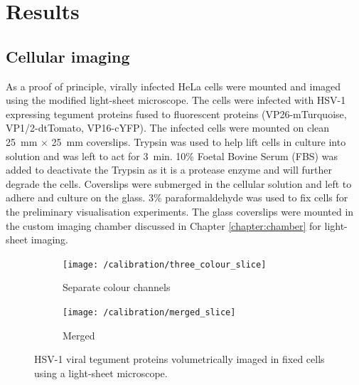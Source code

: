 \section{Results}

\subsection{Cellular imaging}

As a proof of principle, virally infected HeLa cells were mounted and imaged using the modified light-sheet microscope.
The cells were infected with HSV-1 expressing tegument proteins fused to fluorescent proteins (VP26-mTurquoise, VP1/2-dtTomato, VP16-cYFP).
The infected cells were %
mounted on clean \SI{25}{\milli\metre} $\times$ \SI{25}{\milli\metre} coverslips.
Trypsin was used to help lift cells in culture into solution and was left to act for \SI{3}{\minute}.
10\% Foetal Bovine Serum (FBS) was added to deactivate the Trypsin as it is a protease enzyme and will further degrade the cells.
Coverslips were submerged in the cellular solution and left to adhere and culture on the glass.
3\% paraformaldehyde was used to fix cells for the preliminary visualisation experiments.
The glass coverslips were mounted in the custom imaging chamber discussed in Chapter \ref{chapter:chamber} for light-sheet imaging.


\begin{figure}
	\centering
	\begin{subfigure}[b]{0.7\linewidth}
    \centering
    \texttt{[image: /calibration/three\_colour\_slice]}
    \caption{Separate colour channels}
    \label{fig:merged_slice}
	\end{subfigure}
	\begin{subfigure}[b]{0.2\linewidth}
    \centering
    \texttt{[image: /calibration/merged\_slice]}
    \caption{Merged}
    \label{fig:three_colour_slice}
	\end{subfigure}
	\caption{HSV-1 viral tegument proteins volumetrically imaged in fixed cells using a light-sheet microscope.}
	\label{fig:virus_image}
\end{figure}

